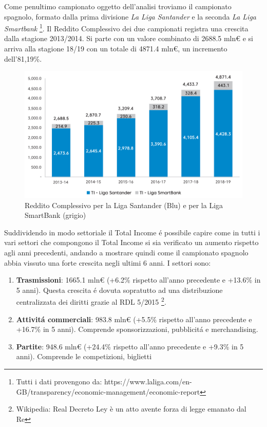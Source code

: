 \documentclass[
    corpo=12pt,
    oneside,
    evenboxes,
    tipotesi=triennale,
    stile=classica,
    oldstyle,
    autoretitolo,
    greek,
]{toptesi}
\begin{document}
\begin{interlinea}{1.5}
Come penultimo campionato oggetto dell'analisi troviamo il campionato spagnolo, formato dalla prima divisione \emph{La Liga Santander} e la seconda
\emph{La Liga Smartbank} \footnote{Tutti i dati provengono da: https://www.laliga.com/en-GB/transparency/economic-management/economic-report}.
Il Reddito Complessivo dei due campionati registra una crescita 
dalla stagione 2013/2014. Si parte con un valore combinato di 2688.5 mln€ e si arriva alla stagione 18/19 con un totale di 4871.4 mln€, 
un incremento dell'81,19\%. 
\begin{figure}
    \centering
    \includegraphics[scale=0.5]{img/total_income_spain.png}
    \caption{Reddito Complessivo per la Liga Santander (Blu) e per la Liga SmartBank (grigio)}
    \label{total_income_spain}
\end{figure}
Suddividendo in modo settoriale il Total Income \'e possibile capire come in tutti i vari settori che compongono il Total Income 
si sia verificato un aumento rispetto agli anni precedenti, andando a mostrare quindi come il campionato spagnolo abbia vissuto una forte crescita negli ultimi 6 anni.
I settori sono:
\begin{enumerate}
    \item \textbf{Trasmissioni}: 1665.1 mln€ (+6.2\% rispetto all'anno precedente e +13.6\% in 5 anni). Questa crescita \'e dovuta sopratutto ad una distribuzione 
    centralizzata dei diritti grazie al RDL 5/2015 \footnote{Wikipedia: Real Decreto Ley è un atto avente forza di legge emanato dal Re}.
    \item \textbf{Attivit\'a commerciali}: 983.8 mln€ (+5.5\% rispetto all'anno precedente e +16.7\% in 5 anni). Comprende sponsorizzazioni,
    pubblicit\'a e merchandising.
    \item \textbf{Partite}: 948.6 mln€ (+24.4\% rispetto all'anno precedente e +9.3\% in 5 anni). Comprende le competizioni, biglietti 

\end{enumerate}
\end{interlinea}
\end{document}
